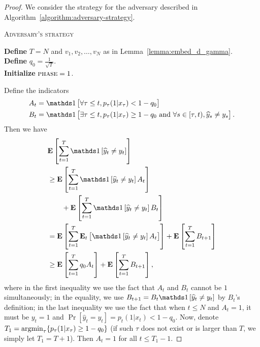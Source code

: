 \begin{proof}
We consider the strategy for the adversary described in
Algorithm~\ref{algorithm:adversary-strategy}.

\begin{algorithm}
\caption{\textsc{Adversary's strategy}}
\label{algorithm:adversary-strategy}
\textbf{Define} $T=N$ and $v_1, v_2, \dots, v_N$ as in Lemma~\ref{lemma:embed_d_gamma}.\\
\textbf{Define} $q_0=\frac{1}{\sqrt{T}}$. \\
\textbf{Initialize} $\textsc{phase}= 1$. \\
\end{algorithm}

Define the indicators
\begin{align*}
A_t &= \indicator{\forall \tau\le t, p_\tau(1|x_\tau)<1-q_0} \\
B_t &= \indicator{\exists \tau\le t, p_\tau(1|x_\tau)\ge 1-q_0
 \text{\ and\ } \forall s\in[\tau,t), \widehat y_s \neq y_s}.
\end{align*}
Then we have
\begin{align}
& \mathbf{E}\left[\sum_{t=1}^{T} \indicator{\widehat y_t\neq y_t}\right] \nonumber \\
& \ge \mathbf{E}\left[\sum_{t=1}^T \indicator{\widehat y_t\neq y_t}A_t\right] \nonumber \\
& \qquad + \mathbf{E}\left[\sum_{t=1}^T \indicator{\widehat y_t\neq y_t}B_t\right] \nonumber \\
& = \mathbf{E}\left[\sum_{t=1}^T \mathbf{E}_t\left[\indicator{\widehat y_t\neq y_t}A_t\right]\right] + \mathbf{E}\left[\sum_{t=1}^T B_{t+1}\right] \nonumber \\
& \ge \mathbf{E}\left[\sum_{t=1}^T q_0 A_t\right] + \mathbf{E}\left[\sum_{t=1}^T B_{t+1}\right],
\label{equation:mistake_lower_bound_temp}
\end{align}
where in the first inequality we use the fact that $A_t$ and $B_t$ cannot be $1$
simultaneously; in the equality, we use $B_{t+1}=B_t\indicator{\widehat y_t\neq
y_t}$ by $B_t$'s definition; in the last inequality we use the fact that when
$t\le N$ and $A_t=1$, it must be $y_t=1$ and $\Pr[\widehat
y_t=y_t]=p_t(1|x_t)<1-q_0$. Now, denote $T_1 = \operatorname*{argmin}_{\tau} \{
p_\tau(1|x_\tau) \ge 1-q_0 \}$ (if such $\tau$ does not exist or is larger than
$T$, we simply let $T_1=T+1$). Then $A_t=1$ for all $t\le
T_1-1$.


\end{proof}
